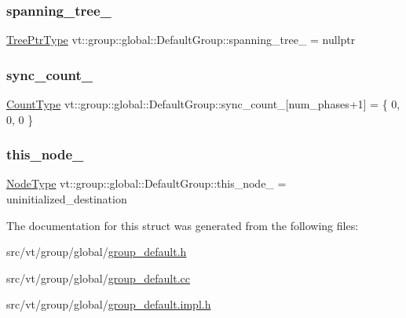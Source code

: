 \subsubsection{\texorpdfstring{spanning\+\_\+tree\+\_\+}{spanning\_tree\_}}
{\footnotesize\ttfamily \hyperlink{structvt_1_1group_1_1global_1_1_default_group_ab4b43c814196cd22463cfa0caad333d6}{Tree\+Ptr\+Type} vt\+::group\+::global\+::\+Default\+Group\+::spanning\+\_\+tree\+\_\+ = nullptr\hspace{0.3cm}{\ttfamily [private]}}

\mbox{\label{structvt_1_1group_1_1global_1_1_default_group_a51f66e9ed5df681da2c0896930adfa77}} 
\subsubsection{\texorpdfstring{sync\+\_\+count\+\_\+}{sync\_count\_}}
{\footnotesize\ttfamily \hyperlink{structvt_1_1group_1_1global_1_1_default_group_a838e3ed0bd877d6ff703705c00c66e95}{Count\+Type} vt\+::group\+::global\+::\+Default\+Group\+::sync\+\_\+count\+\_\+\mbox{[}num\+\_\+phases+1\mbox{]} = \{ 0, 0, 0 \}\hspace{0.3cm}{\ttfamily [private]}}

\mbox{\label{structvt_1_1group_1_1global_1_1_default_group_a541865b66d88e4afa0331f3f5378d5a4}} 
\subsubsection{\texorpdfstring{this\+\_\+node\+\_\+}{this\_node\_}}
{\footnotesize\ttfamily \hyperlink{namespacevt_a866da9d0efc19c0a1ce79e9e492f47e2}{Node\+Type} vt\+::group\+::global\+::\+Default\+Group\+::this\+\_\+node\+\_\+ = uninitialized\+\_\+destination\hspace{0.3cm}{\ttfamily [private]}}



The documentation for this struct was generated from the following files\+:\begin{DoxyCompactItemize}
\item 
src/vt/group/global/\hyperlink{group__default_8h}{group\+\_\+default.\+h}\item 
src/vt/group/global/\hyperlink{group__default_8cc}{group\+\_\+default.\+cc}\item 
src/vt/group/global/\hyperlink{group__default_8impl_8h}{group\+\_\+default.\+impl.\+h}\end{DoxyCompactItemize}

